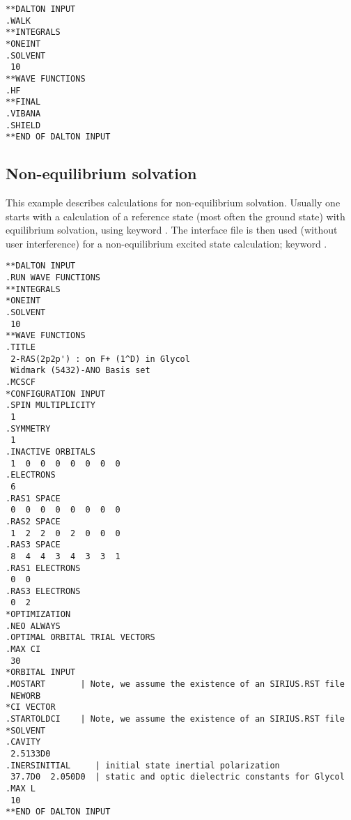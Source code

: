 \begin{verbatim}
**DALTON INPUT
.WALK
**INTEGRALS
*ONEINT
.SOLVENT
 10
**WAVE FUNCTIONS
.HF
**FINAL
.VIBANA
.SHIELD
**END OF DALTON INPUT
\end{verbatim}


\subsection{Non-equilibrium solvation}\label{sec:solvnoneqrsp}

This example describes calculations for non-equilibrium
solvation. Usually one starts with a calculation of a reference state
(most often the ground state) with equilibrium solvation, using
keyword . The interface file is then
used (without user interference) for
a non-equilibrium excited state calculation; keyword
.

\begin{verbatim}
**DALTON INPUT
.RUN WAVE FUNCTIONS
**INTEGRALS
*ONEINT
.SOLVENT
 10
**WAVE FUNCTIONS
.TITLE
 2-RAS(2p2p') : on F+ (1^D) in Glycol
 Widmark (5432)-ANO Basis set
.MCSCF
*CONFIGURATION INPUT
.SPIN MULTIPLICITY
 1
.SYMMETRY
 1
.INACTIVE ORBITALS
 1  0  0  0  0  0  0  0
.ELECTRONS
 6
.RAS1 SPACE
 0  0  0  0  0  0  0  0
.RAS2 SPACE
 1  2  2  0  2  0  0  0
.RAS3 SPACE
 8  4  4  3  4  3  3  1
.RAS1 ELECTRONS
 0  0
.RAS3 ELECTRONS
 0  2
*OPTIMIZATION
.NEO ALWAYS
.OPTIMAL ORBITAL TRIAL VECTORS
.MAX CI
 30
*ORBITAL INPUT
.MOSTART       | Note, we assume the existence of an SIRIUS.RST file
 NEWORB
*CI VECTOR
.STARTOLDCI    | Note, we assume the existence of an SIRIUS.RST file
*SOLVENT
.CAVITY
 2.5133D0
.INERSINITIAL     | initial state inertial polarization
 37.7D0  2.050D0  | static and optic dielectric constants for Glycol
.MAX L
 10
**END OF DALTON INPUT
\end{verbatim}
